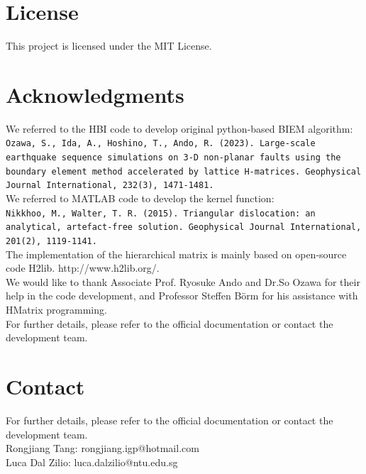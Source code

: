 \documentclass[a4paper,12pt]{article}
\begin{document}
\section{License}
This project is licensed under the MIT License.

\section{Acknowledgments}

We referred to the HBI code to develop original python-based BIEM algorithm:\\
\texttt{Ozawa, S., Ida, A., Hoshino, T., Ando, R. (2023). Large-scale earthquake sequence simulations on 3-D non-planar faults using the boundary element method accelerated by lattice H-matrices. Geophysical Journal International, 232(3), 1471-1481.}\\

We referred to MATLAB code to develop the kernel function:\\
\texttt{Nikkhoo, M., Walter, T. R. (2015). Triangular dislocation: an analytical, artefact-free solution. Geophysical Journal International, 201(2), 1119-1141.}\\

The implementation of the hierarchical matrix is mainly based on open-source code H2lib. http://www.h2lib.org/.\\

We would like to thank Associate Prof. Ryosuke Ando and Dr.So Ozawa for their help in the code development, and Professor Steffen Börm for his assistance with HMatrix programming.\\

For further details, please refer to the official documentation or contact the development team.


\section{Contact}
For further details, please refer to the official documentation or contact the development team.\\
Rongjiang Tang: rongjiang.igp@hotmail.com\\
Luca Dal Zilio: luca.dalzilio@ntu.edu.sg
\end{document}
